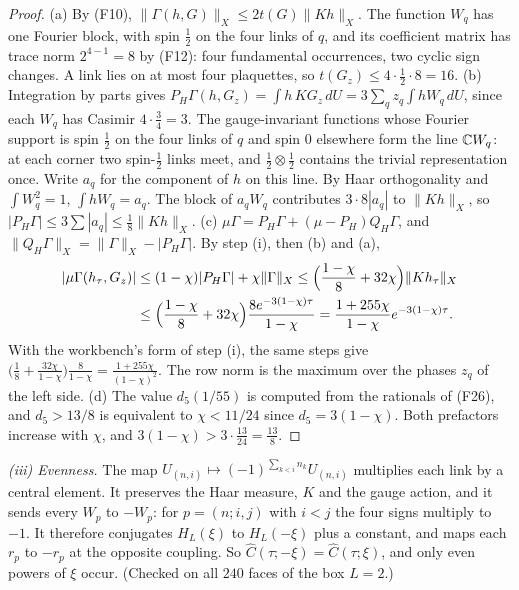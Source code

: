 \begin{proof}
(a) By (F10), $\|\Gamma(h,G)\|_X\le2t(G)\|Kh\|_X$. The function $W_q$ has one Fourier block, with spin $\frac12$ on the four links of $q$, and its coefficient matrix has trace norm $2^{4-1}=8$ by (F12): four fundamental occurrences, two cyclic sign changes. A link lies on at most four plaquettes, so $t(G_z)\le4\cdot\frac12\cdot8=16$.
(b) Integration by parts gives $P_H\Gamma(h,G_z)=\int h\,KG_z\,dU=3\sum_qz_q\int hW_q\,dU$, since each $W_q$ has Casimir $4\cdot\frac34=3$. The gauge-invariant functions whose Fourier support is spin $\frac12$ on the four links of $q$ and spin $0$ elsewhere form the line $\mathbb{C} W_q$: at each corner two spin-$\frac12$ links meet, and $\frac12\otimes\frac12$ contains the trivial representation once. Write $a_q$ for the component of $h$ on this line. By Haar orthogonality and $\int W_q^2=1$, $\int hW_q=a_q$. The block of $a_qW_q$ contributes $3\cdot8|a_q|$ to $\|Kh\|_X$, so $|P_H\Gamma|\le3\sum|a_q|\le\frac18\|Kh\|_X$.
(c) $\mu\Gamma=P_H\Gamma+(\mu-P_H)Q_H\Gamma$, and $\|Q_H\Gamma\|_X=\|\Gamma\|_X-|P_H\Gamma|$. By step (i), then (b) and (a),
\begin{align*}
|\mu\Gamma(h_\tau,G_z)|&\le(1-\chi)|P_H\Gamma|+\chi\|\Gamma\|_X\le\Bigl(\frac{1-\chi}8+32\chi\Bigr)\|Kh_\tau\|_X\\
&\le\Bigl(\frac{1-\chi}8+32\chi\Bigr)\frac{8e^{-3(1-\chi)\tau}}{1-\chi}=\frac{1+255\chi}{1-\chi}e^{-3(1-\chi)\tau}.
\end{align*}
With the workbench's form of step (i), the same steps give $\bigl(\frac18+\frac{32\chi}{1-\chi}\bigr)\frac8{1-\chi}=\frac{1+255\chi}{(1-\chi)^2}$. The row norm is the maximum over the phases $z_q$ of the left side.
(d) The value $d_5(1/55)$ is computed from the rationals of (F26), and $d_5>13/8$ is equivalent to $\chi<11/24$ since $d_5=3(1-\chi)$. Both prefactors increase with $\chi$, and $3(1-\chi)>3\cdot\frac{13}{24}=\frac{13}8$.
\end{proof}

\emph{(iii) Evenness.} The map $U_{(n,i)}\mapsto(-1)^{\sum_{k<i}n_k}U_{(n,i)}$ multiplies each link by a central element. It preserves the Haar measure, $K$ and the gauge action, and it sends every $W_p$ to $-W_p$: for $p=(n;i,j)$ with $i<j$ the four signs multiply to $-1$. It therefore conjugates $H_L(\xi)$ to $H_L(-\xi)$ plus a constant, and maps each $r_p$ to $-r_p$ at the opposite coupling. So $\widehat C(\tau;-\xi)=\widehat C(\tau;\xi)$, and only even powers of $\xi$ occur. (Checked on all $240$ faces of the box $L=2$.)

